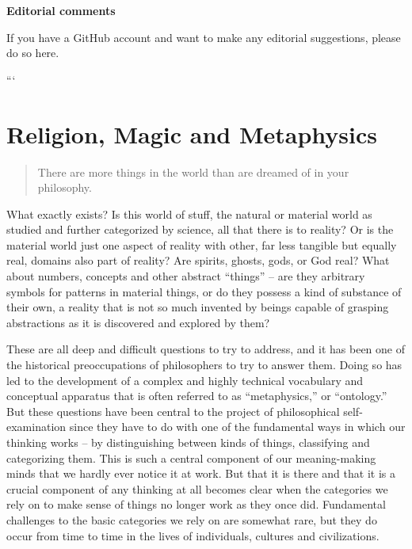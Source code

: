 \documentclass[
  12pt, openany]{book}
\begin{document}
\textbf{Editorial comments}

If you have a GitHub account and want to make any editorial suggestions, please do so here.

```

\hypertarget{religion-magic-and-metaphysics}{%
\chapter{Religion, Magic and Metaphysics}\label{religion-magic-and-metaphysics}}

\begin{quote}
There are more things in the world than are dreamed of in your philosophy.
\end{quote}

What exactly exists? Is this world of stuff, the natural or material world as studied and further categorized by science, all that there is to reality? Or is the material world just one aspect of reality with other, far less tangible but equally real, domains also part of reality? Are spirits, ghosts, gods, or God real? What about numbers, concepts and other abstract ``things'' -- are they arbitrary symbols for patterns in material things, or do they possess a kind of substance of their own, a reality that is not so much invented by beings capable of grasping abstractions as it is discovered and explored by them?

These are all deep and difficult questions to try to address, and it has been one of the historical preoccupations of philosophers to try to answer them. Doing so has led to the development of a complex and highly technical vocabulary and conceptual apparatus that is often referred to as ``metaphysics,'' or ``ontology.'' But these questions have been central to the project of philosophical self-examination since they have to do with one of the fundamental ways in which our thinking works -- by distinguishing between kinds of things, classifying and categorizing them. This is such a central component of our meaning-making minds that we hardly ever notice it at work. But that it is there and that it is a crucial component of any thinking at all becomes clear when the categories we rely on to make sense of things no longer work as they once did. Fundamental challenges to the basic categories we rely on are somewhat rare, but they do occur from time to time in the lives of individuals, cultures and civilizations.
\end{document}
